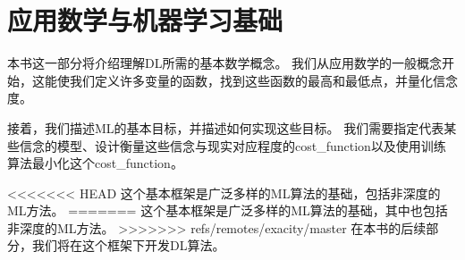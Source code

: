 \part{应用数学与机器学习基础}
\label{part:applied_math_and_machine_learning_basics}

\newpage

本书这一部分将介绍理解\gls{DL}所需的基本数学概念。
我们从应用数学的一般概念开始，这能使我们定义许多变量的函数，找到这些函数的最高和最低点，并量化信念度。

接着，我们描述\gls{ML}的基本目标，并描述如何实现这些目标。
我们需要指定代表某些信念的模型、设计衡量这些信念与现实对应程度的\gls{cost_function}以及使用训练算法最小化这个\gls{cost_function}。


<<<<<<< HEAD
这个基本框架是广泛多样的\gls{ML}算法的基础，包括非深度的\gls{ML}方法。
=======
这个基本框架是广泛多样的\gls{ML}算法的基础，其中也包括非深度的\gls{ML}方法。
>>>>>>> refs/remotes/exacity/master
在本书的后续部分，我们将在这个框架下开发\gls{DL}算法。






